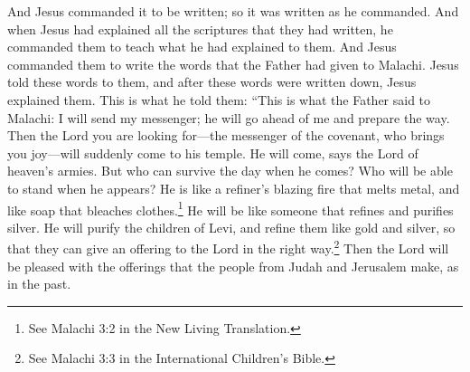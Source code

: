 And Jesus commanded it to be written; so it was written as he commanded.
\bverse \iffalse And now it came to pass that when Jesus had expounded all the scriptures in one, which they had written, he commanded them that they should teach the things which he had expounded unto them. \fi
And when Jesus had explained all the scriptures that they had written, he commanded them to teach what he had explained to them.
\bchapter
\bverse \iffalse And it came to pass that he commanded them that they should write the words which the Father had given unto Malachi, which he should tell unto them. And it came to pass that after they were written he expounded them. And these are the words which he did tell unto them, saying: Thus said the Father unto Malachi--Behold, I will send my messenger, and he shall prepare the way before me, and the Lord whom ye seek shall suddenly come to his temple, even the messenger of the covenant, whom ye delight in; behold, he shall come, saith the Lord of Hosts. \fi
And Jesus commanded them to write the words that the Father had given to Malachi. Jesus told these words to them, and after these words were written down, Jesus explained them. This is what he told them: ``This is what the Father said to Malachi: I will send my messenger; he will go ahead of me and prepare the way. Then the Lord you are looking for---the messenger of the covenant, who brings you joy---will suddenly come to his temple. He will come, says the Lord of heaven's armies.
\bverse \iffalse But who may abide the day of his coming, and who shall stand when he appeareth? For he is like a refiner's fire, and like fuller's soap. \fi
But who can survive the day when he comes? Who will be able to stand when he appears? He is like a refiner's blazing fire that melts metal, and like soap that bleaches clothes.\footnote{See Malachi 3:2 in the New Living Translation.}
\bverse \iffalse And he shall sit as a refiner and purifier of silver; and he shall purify the sons of Levi, and purge them as gold and silver, that they may offer unto the Lord an offering in righteousness. \fi
He will be like someone that refines and purifies silver. He will purify the children of Levi, and refine them like gold and silver, so that they can give an offering to the Lord in the right way.\footnote{See Malachi 3:3 in the International Children's Bible.}
\bverse \iffalse Then shall the offering of Judah and Jerusalem be pleasant unto the Lord, as in the days of old, and as in former years. \fi
Then the Lord will be pleased with the offerings that the people from Judah and Jerusalem make, as in the past.

